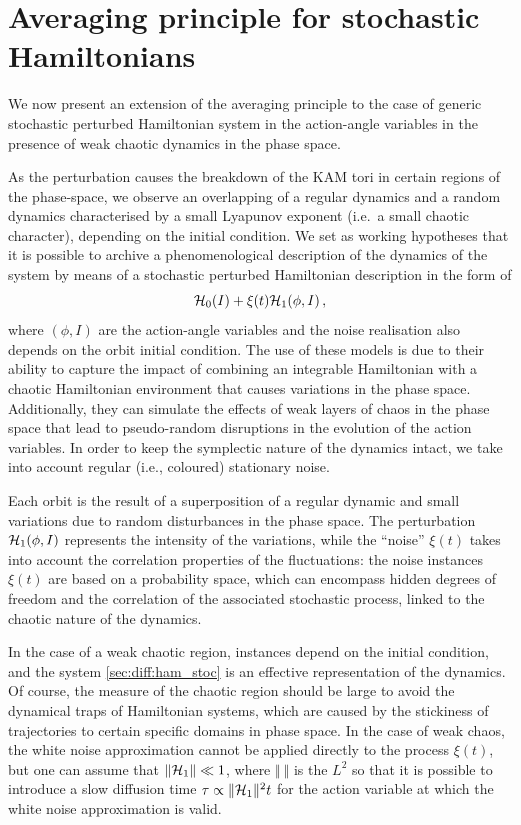 %
\section{Averaging principle for stochastic Hamilto\-nians}\label{sec:diff:averaging_principle}
%
We now present an extension of the averaging principle to the case of generic stochastic perturbed Hamiltonian system in the action-angle variables in the presence of weak chaotic dynamics in the phase space.

As the perturbation causes the breakdown of the KAM tori in certain regions of the phase-space, we observe an overlapping of a regular dynamics and a random dynamics characterised by a small Lyapunov exponent (i.e.\ a small chaotic character), depending on the initial condition. We set as working hypotheses that it is possible to archive a phenomenological description of the dynamics of the system by means of a stochastic perturbed Hamiltonian description in the form of
\begin{equation}
    \mathcal{H}_0(I)+\xi(t) \mathcal{H}_1(\phi,I) \,,
    \label{sec:diff:ham_stoc}
\end{equation}
where $(\phi,I)$ are the action-angle variables and the noise realisation also depends on the orbit initial condition. The use of these models is due to their ability to capture the impact of combining an integrable Hamiltonian with a chaotic Hamiltonian environment that causes variations in the phase space. Additionally, they can simulate the effects of weak layers of chaos in the phase space that lead to pseudo-random disruptions in the evolution of the action variables. In order to keep the symplectic nature of the dynamics intact, we take into account regular (i.e., coloured) stationary noise.

Each orbit is the result of a superposition of a regular dynamic and small variations due to random disturbances in the phase space. The perturbation $\mathcal{H}_1(\phi,I)$ represents the intensity of the variations, while the ``noise'' $\xi(t)$ takes into account the correlation properties of the fluctuations: the noise instances $\xi(t)$ are based on a probability space, which can encompass hidden degrees of freedom and the correlation of the associated stochastic process, linked to the chaotic nature of the dynamics.

In the case of a weak chaotic region, instances depend on the initial condition, and the system \eqref{sec:diff:ham_stoc} is an effective representation of the dynamics. Of course, the measure of the chaotic region should be large to avoid the dynamical traps of Hamiltonian systems, which are caused by the stickiness of trajectories to certain specific domains in phase space. In the case of weak chaos, the white noise approximation cannot be applied directly to the process $\xi(t)$, but one can assume that $\Vert \mathcal{H}_1\Vert \ll 1$, where $\Vert\ \Vert$ is the $L^2$ so that it is possible to introduce a slow diffusion time $\tau \propto \Vert \mathcal{H}_1\Vert^2 t$ for the action variable at which the white noise approximation is valid.

